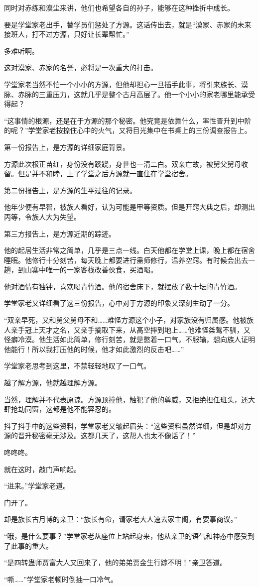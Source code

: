 \begin{this_body}
同时对赤练和漠尘来讲，他们也希望各自的孙子，能够在这种挫折中成长。

要是学堂家老出手，替学员们惩处了方源。这话传出去，就是“漠家、赤家的未来接班人，打不过方源，只好让长辈帮忙。”

多难听啊。

这对漠家、赤家的名誉，必将是一次重大的打击。

学堂家老当然不怕一个小小的方源，但他却担心一旦插手此事，将引来族长、漠脉、赤脉的三重压力，这就几乎是整个古月高层了。他一个小小的家老哪里能承受得起？

“这事情的根源，还是在于方源的那个秘密。他究竟是依靠什么，率性晋升到中阶的呢？”学堂家老按捺住心中的火气，又将目光集中在书桌上的三份调查报告上。

第一份报告上，是方源的详细家庭背景。

方源此次根正苗红，身份没有蹊跷，身世也一清二白。双亲亡故，被舅父舅母收留。但是并不和睦，上了学堂之后方源就一直住在学堂宿舍。

第二份报告上，是方源的生平过往的记录。

他年少便有早智，被族人看好，认为可能是甲等资质。但是开窍大典之后，却测出丙等，令族人大为失望。

第三方报告上，是方源近期的踪迹。

他的起居生活非常之简单，几乎是三点一线。白天他都在学堂上课，晚上都在宿舍睡眠。他修行十分刻苦，每天晚上都要进行蛊师修行，温养空窍。有时候会出去一趟，到山寨中唯一的一家客栈改善伙食，买酒喝。

他对酒情有独钟，喜欢喝青竹酒。他的宿舍床下，就摆放了数十坛的青竹酒。

学堂家老又详细看了这三份报告，心中对于方源的印象又深刻生动了一分。

“双亲早死，又和舅父舅母不和……难怪方源这个小子，对家族没有归属感。他被族人亲手冠上天才之名，又亲手摘取下来，从高空摔到地上……他难怪桀骜不驯，又怪癖冷漠。他生活如此简单，修行刻苦，就是憋着一口气，不服输，想向族人证明他能行！所以我打压他的时候，他才如此激烈的反击吧……”

学堂家老思考到这里，不禁轻轻地叹了一口气。

越了解方源，他就越理解方源。

当然，理解并不代表原谅。方源顶撞他，触犯了他的尊威，又拒绝担任班头，还大肆抢劫同窗，这都是他不能容忍的。

抖了抖手中的这些资料，学堂家老又皱起眉头：“这些资料虽然详细，但是却对方源的晋升秘密毫无涉及。这都几天了，这帮人也太不像话了！”

咚咚咚。

就在这时，敲门声响起。

“进来。”学堂家老道。

门开了。

却是族长古月博的亲卫：“族长有命，请家老大人速去家主阁，有要事商议。”

“哦，是什么要事？”学堂家老从座位上站起身来，他从亲卫的语气和神态中感受到了此事的重大。

“是四转蛊师贾富大人又回来了，他的弟弟贾金生行踪不明！”亲卫答道。

“嘶……”学堂家老顿时倒抽一口冷气。

\end{this_body}

